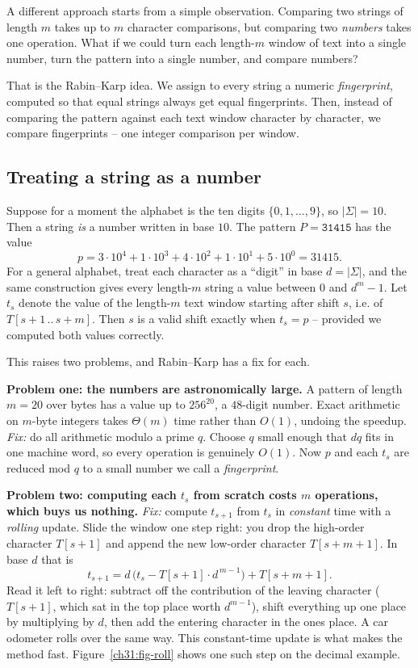 A different approach starts from a simple observation.
Comparing two strings of length $m$ takes up to $m$ character comparisons, but
comparing two \emph{numbers} takes one operation. What if we could turn each
length-$m$ window of text into a single number, turn the pattern into a single
number, and compare numbers?

That is the Rabin--Karp idea. We assign to every string a numeric
\emph{fingerprint}, computed so that equal strings always get equal
fingerprints. Then, instead of comparing the pattern against each text window
character by character, we compare fingerprints -- one integer comparison per
window.

\subsection{Treating a string as a number}

Suppose for a moment the alphabet is the ten digits $\{0,1,\ldots,9\}$, so
$|\Sigma| = 10$. Then a string \emph{is} a number written in base $10$. The
pattern $P = \texttt{31415}$ has the value
\[
  p = 3\cdot 10^4 + 1\cdot 10^3 + 4\cdot 10^2 + 1\cdot 10^1 + 5\cdot 10^0
    = 31415.
\]
For a general alphabet, treat each character as a ``digit'' in base
$d = |\Sigma|$, and the same construction gives every length-$m$ string a value
between $0$ and $d^m - 1$. Let $t_s$ denote the value of the length-$m$ text
window starting after shift $s$, i.e. of $T[s+1\,..\,s+m]$. Then $s$ is a valid
shift exactly when $t_s = p$ -- provided we computed both values correctly.

This raises two problems, and Rabin--Karp has a fix for each.

\textbf{Problem one: the numbers are astronomically large.} A pattern of length
$m=20$ over bytes has a value up to $256^{20}$, a $48$-digit number. Exact arithmetic
on $m$-byte integers takes $\Theta(m)$ time rather than $O(1)$, undoing the speedup. \emph{Fix:} do all arithmetic modulo a prime $q$. Choose $q$
small enough that $dq$ fits in one machine word, so every operation is genuinely
$O(1)$. Now $p$ and each $t_s$ are reduced mod $q$ to a small number we call a
\emph{fingerprint}.

\textbf{Problem two: computing each $t_s$ from scratch costs $m$ operations,
which buys us nothing.} \emph{Fix:} compute $t_{s+1}$ from $t_s$ in
\emph{constant} time with a \emph{rolling} update. Slide the window one step
right: you drop the high-order character $T[s+1]$ and append the new low-order
character $T[s+m+1]$. In base $d$ that is
\[
  t_{s+1} = d\,\bigl(t_s - T[s+1]\cdot d^{\,m-1}\bigr) + T[s+m+1].
\]
Read it left to right: subtract off the contribution of the leaving character
($T[s+1]$, which sat in the top place worth $d^{m-1}$), shift everything up one
place by multiplying by $d$, then add the entering character in the ones place.
A car odometer rolls over the same way. This constant-time update is what
makes the method fast. Figure~\ref{ch31:fig-roll} shows one such step on the decimal example.

